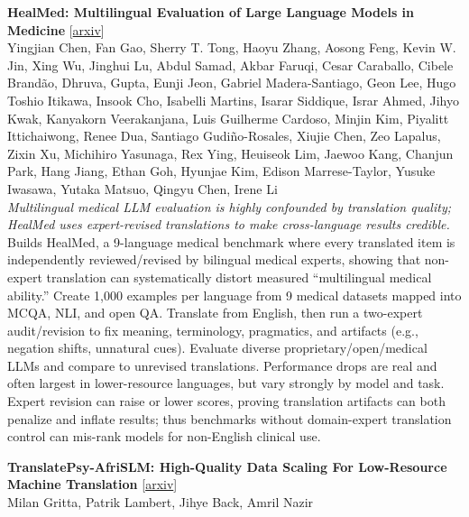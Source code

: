 \documentclass[12pt,letterpaper]{article}
\begin{document}
\medskip

{\small\textbf{HealMed: Multilingual Evaluation of Large Language Models in Medicine}} {\scriptsize[\href{https://arxiv.org/abs/2608.19981}{arxiv}]}\\
{\scriptsize Yingjian Chen, Fan Gao, Sherry T. Tong, Haoyu Zhang, Aosong Feng, Kevin W. Jin, Xing Wu, Jinghui Lu, Abdul Samad, Akbar Faruqi, Cesar Caraballo, Cibele Brandão,  Dhruva,  Gupta, Eunji Jeon, Gabriel Madera-Santiago, Geon Lee, Hugo Toshio Itikawa, Insook Cho, Isabelli Martins, Isarar Siddique, Israr Ahmed, Jihyo Kwak, Kanyakorn Veerakanjana, Luis Guilherme Cardoso, Minjin Kim, Piyalitt Ittichaiwong, Renee Dua, Santiago Gudiño-Rosales, Xiujie Chen, Zeo Lapalus, Zixin Xu, Michihiro Yasunaga, Rex Ying, Heuiseok Lim, Jaewoo Kang, Chanjun Park, Hang Jiang, Ethan Goh, Hyunjae Kim, Edison Marrese-Taylor, Yusuke Iwasawa, Yutaka Matsuo, Qingyu Chen, Irene Li}\\

{\small\textit{Multilingual medical LLM evaluation is highly confounded by translation quality; HealMed uses expert-revised translations to make cross-language results credible.}}\\[1pt]
{\footnotesize Builds HealMed, a 9-language medical benchmark where every translated item is independently reviewed/revised by bilingual medical experts, showing that non-expert translation can systematically distort measured ``multilingual medical ability.'' Create 1,000 examples per language from 9 medical datasets mapped into MCQA, NLI, and open QA. Translate from English, then run a two-expert audit/revision to fix meaning, terminology, pragmatics, and artifacts (e.g., negation shifts, unnatural cues). Evaluate diverse proprietary/open/medical LLMs and compare to unrevised translations. Performance drops are real and often largest in lower-resource languages, but vary strongly by model and task. Expert revision can raise or lower scores, proving translation artifacts can both penalize and inflate results; thus benchmarks without domain-expert translation control can mis-rank models for non-English clinical use.}

\medskip

{\small\textbf{TranslatePsy-AfriSLM: High-Quality Data Scaling For Low-Resource Machine Translation}} {\scriptsize[\href{https://arxiv.org/abs/2608.18655}{arxiv}]}\\
{\scriptsize Milan Gritta, Patrik Lambert, Jihye Back, Amril Nazir}\\
\end{document}
